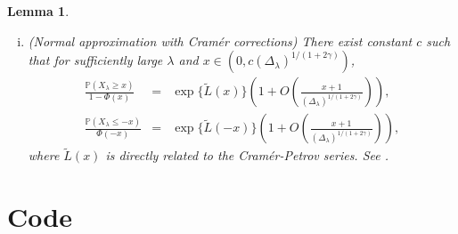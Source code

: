 \documentclass[12pt]{article}
\newcommand{\IP}{\mathbb{P}}
\newtheorem{lemma}[prop]{Lemma}
\numberwithin{equation}{section}
\begin{document}
\begin{lemma}
\begin{enumerate}[i.]
\item (Normal approximation with Cram\'er corrections) {\rm There exist constant $c$ such that for sufficiently large $\lambda$ and $x\in(0,c(\Delta_\lambda)^{1/(1+2\gamma)})$,
\begin{eqnarray*}
\frac{\IP(X_\lambda\geq x)}{1-\Phi(x)}&=&\exp\{\tilde{L}(x)\}\left(1+O\left(\frac{x+1}{(\Delta_\lambda)^{1/(1+2\gamma)}}\right)\right),\\
\frac{\IP(X_\lambda\leq -x)}{\Phi(-x)}&=&\exp\{\tilde{L}(-x)\}\left(1+O\left(\frac{x+1}{(\Delta_\lambda)^{1/(1+2\gamma)}}\right)\right),
\end{eqnarray*}
where $\tilde{L}(x)$ is directly related to the Cram\'er-Petrov series. See \cite[Lemma~2.3]{saulis}.}
\end{enumerate}
\end{lemma}

\section{Code}
 
\end{document}
